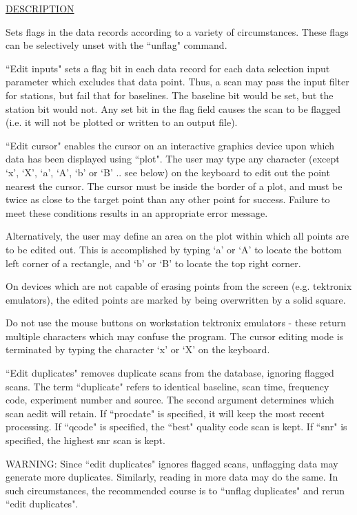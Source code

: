 \underline{DESCRIPTION}
\begin{list}{}{\setlength{\leftmargin}{0.5in}
     \setlength{\rightmargin}{0in}}
\item
Sets flags in the data records according to a variety of
circumstances.  These flags can be selectively unset with
the ``unflag" command.
\item
``Edit inputs" sets a flag bit in each data record for each
data selection input parameter which excludes that data point.
Thus, a scan may pass the input filter for stations, but fail
that for baselines.  The baseline bit would be set, but the
station bit would not.  Any set bit in the flag field causes
the scan to be flagged (i.e. it will not be plotted or written
to an output file).
\item
``Edit cursor" enables the cursor on an interactive graphics device
upon which data has been displayed using ``plot".  The user may
type any character (except `x', `X', `a', `A', `b' or `B' ..  see 
below) on the keyboard to edit out the point nearest the cursor.
The cursor must be inside the border of a plot, and must be twice 
as close to the target point than any other point for success.  
Failure to meet these conditions results in an appropriate error 
message.    
\item
Alternatively, the user may define an area on the plot within which
all points are to be edited out.  This is accomplished by typing
`a' or `A' to locate the bottom left corner of a rectangle, and
`b' or `B' to locate the top right corner. 
\item
On devices which are not capable of erasing points from the screen
(e.g. tektronix emulators), the edited points are marked by being
overwritten by a solid square.
\item
Do not use the mouse buttons on workstation tektronix emulators - 
these return multiple characters which may confuse the program.
The cursor editing mode is terminated by typing the character `x' 
or `X' on the keyboard.
\item
``Edit duplicates" removes duplicate scans from the database, 
ignoring flagged scans.  The term ``duplicate" refers to identical
baseline, scan time, frequency code, experiment number and source.
The second argument determines which scan aedit will retain.  If
``procdate" is specified, it will keep the most recent processing.
If ``qcode" is specified, the ``best" quality code scan is kept. If
``snr" is specified, the highest snr scan is kept.
\item
WARNING: Since ``edit duplicates" ignores flagged scans, unflagging
data may generate more duplicates.  Similarly, reading in more
data may do the same.  In such circumstances, the recommended
course is to ``unflag duplicates" and rerun ``edit duplicates".
\end{list}
\vspace{.2in}

